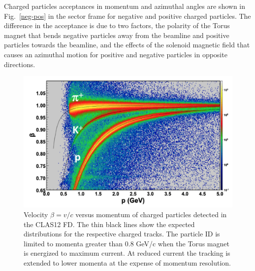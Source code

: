 \documentclass[final,3p,twocolumn]{elsarticle}
\begin{document}
 Charged particles acceptances in momentum and azimuthal angles are shown in Fig.~\ref{neg-pos} in the sector frame for negative and positive charged particles. The difference in the acceptance is due to two factors, the polarity of the Torus magnet that bends negative particles away from the beamline and positive particles towards the beamline, and the effects of the solenoid magnetic field that causes an azimuthal motion for positive and negative particles in opposite directions. 
\begin{figure}[htbp!]
\centerline{\includegraphics[width=1.1\columnwidth]{FTOF1b_pid.png}}
\caption{Velocity $\beta = v/c $ versus momentum of charged particles detected in the CLAS12 FD. The thin black lines show the expected distributions
for the respective charged tracks. The particle ID is limited to momenta greater than 0.8 GeV/c when the Torus magnet is energized to maximum 
current. At reduced current the tracking is extended to lower momenta at the expense of momentum resolution. }
\label{pid}
\end{figure} 
\end{document}
